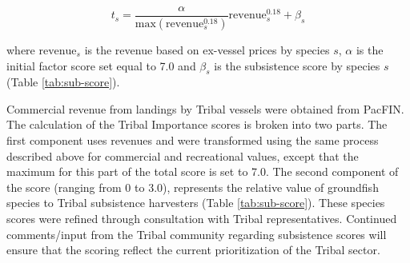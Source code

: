 \documentclass[11pt,
  english,
  a4paper,
]{article}
\begin{document}

\begin{equation}
t_{s} = \frac{\alpha}{\text{max}(\text{revenue}_{s}^{0.18})} \text{revenue}_{s}^{0.18} + \beta_s    
\end{equation}

\leavevmode\tagmcend\tagstructend\par


where {\(\text{revenue}_s\)\leavevmode\tagmcend\tagstructend} is the revenue based on ex-vessel prices by species {\(s\)\leavevmode\tagmcend\tagstructend}, {\(\alpha\)\leavevmode\tagmcend\tagstructend} is the initial factor score set equal to 7.0 and {\(\beta_s\)\leavevmode\tagmcend\tagstructend} is the subsistence score by species {\(s\)\leavevmode\tagmcend\tagstructend} (Table \ref{tab:sub-score}).

\leavevmode\tagmcend\tagstructend\par


Commercial revenue from landings by Tribal vessels were obtained from PacFIN. The calculation of the Tribal Importance scores is broken into two parts. The first component uses revenues and were transformed using the same process described above for commercial and recreational values, except that the maximum for this part of the total score is set to 7.0. The second component of the score (ranging from 0 to 3.0), represents the relative value of groundfish species to Tribal subsistence harvesters (Table \ref{tab:sub-score}). These species scores were refined through consultation with Tribal representatives. Continued comments/input from the Tribal community regarding subsistence scores will ensure that the scoring reflect the current prioritization of the Tribal sector.

\leavevmode\tagmcend\tagstructend\par

\begingroup\fontsize{10}{12}\selectfont
\begingroup\fontsize{10}{12}\selectfont
\end{document}
